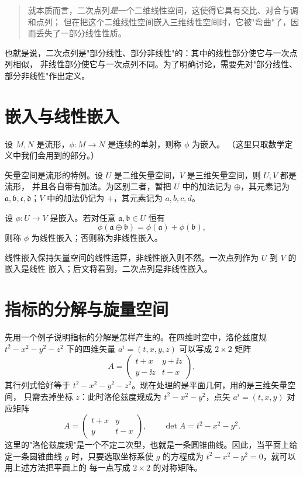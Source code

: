 \begin{quote}
就本质而言，二次点列\emph{是}一个二维线性空间，这使得它具有交比、对合与调和点列；
但在把这个二维线性空间嵌入三维线性空间时，它被"弯曲"了，因而丢失了一部分线性性质。
\end{quote}

也就是说，二次点列是"部分线性、部分非线性"的：其中的线性部分使它与一次点列相似，
非线性部分使它与一次点列不同。为了明确讨论，需要先对"部分线性、部分非线性"作出定义。

\section{嵌入与线性嵌入}

\begin{definition}[嵌入]
设 $M,N$ 是流形，$\phi:M\to N$ 是连续的单射，则称 $\phi$ 为嵌入。
（这里只取数学定义中我们会用到的部分。）
\end{definition}

矢量空间是流形的特例。设 $U$ 是二维矢量空间，$V$ 是三维矢量空间，则 $U,V$ 都是流形，
并且各自带有加法。为区别二者，暂把 $U$ 中的加法记为 $\oplus$，其元素记为
$\mathfrak a,\mathfrak b,\mathfrak c,\mathfrak d$；$V$ 中的加法仍记为 $+$，其元素记为
$a,b,c,d$。

\begin{definition}[线性嵌入与非线性嵌入]
设 $\phi:U\to V$ 是嵌入。若对任意 $\mathfrak a,\mathfrak b\in U$ 恒有
\[
\phi(\mathfrak a\oplus\mathfrak b)=\phi(\mathfrak a)+\phi(\mathfrak b),
\]
则称 $\phi$ 为线性嵌入；否则称为非线性嵌入。
\end{definition}

线性嵌入保持矢量空间的线性运算，非线性嵌入则不然。一次点列作为 $U$ 到 $V$ 的嵌入是线性
嵌入；后文将看到，二次点列是非线性嵌入。

\section{指标的分解与旋量空间}

先用一个例子说明指标的分解是怎样产生的。在四维时空中，洛伦兹度规
$t^2-x^2-y^2-z^2$ 下的四维矢量 $a^i=(t,x,y,z)$ 可以写成 $2\times2$ 矩阵
\[
A=\begin{pmatrix} t+x & y+\ii z\\ y-\ii z & t-x\end{pmatrix},
\]
其行列式恰好等于 $t^2-x^2-y^2-z^2$。现在处理的是平面几何，用的是三维矢量空间，
只需去掉坐标 $z$：此时洛伦兹度规成为 $t^2-x^2-y^2$，点矢 $a^i=(t,x,y)$ 对应矩阵
\[
A=\begin{pmatrix} t+x & y\\ y & t-x\end{pmatrix},
\qquad \det A=t^2-x^2-y^2 .
\]
这里的"洛伦兹度规"是一个不定二次型，也就是一条圆锥曲线。因此，当平面上给定一条圆锥曲线
$g$ 时，只要选取坐标系使 $g$ 的方程成为 $t^2-x^2-y^2=0$，就可以用上述方法把平面上的
每一点写成 $2\times2$ 的对称矩阵。

